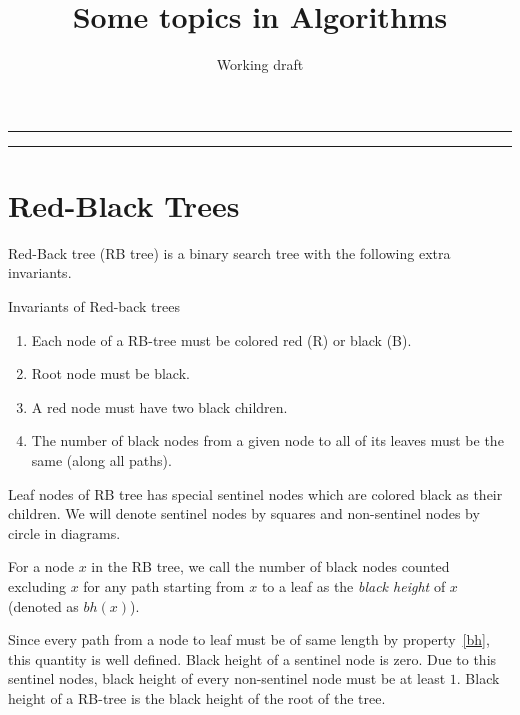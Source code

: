 \documentclass[10pt]{article}
\begin{document}
\title{Some topics in Algorithms}
\author{Working draft}
\maketitle
\hrule
\begin{multicols}{2}
{\footnotesize \tableofcontents }
\end{multicols}
\hrule

\section{Red-Black Trees}
\begin{center}
\end{center}
Red-Back tree (RB tree) is a binary search tree with the following extra
invariants.  
\begin{definition}{Invariants of Red-back trees}
\begin{enumerate}
	\item Each node of a RB-tree must be colored red (R) or black (B).
		\label{r_or_b}
	\item Root node must be black. \label{r_m_b}
	\item A red node must have two black children. \label{r_m_bc}
	\item The number of black nodes from a given node to all of its 
		leaves must be the same (along all paths). \label{bh}
\end{enumerate}
\end{definition}
Leaf nodes of RB tree has special sentinel nodes which are colored black as
their children. We will denote sentinel nodes by squares and non-sentinel
nodes by circle in diagrams.

\begin{definition}
For a node $x$ in the RB tree, we call the number of black nodes counted
excluding $x$ for any path starting from $x$ to a leaf as the \emph{black
height} of $x$ (denoted as $bh(x)$).
\end{definition}
Since every path from a node to leaf must be of same length by
property~\ref{bh}, this quantity is well defined. Black height of a sentinel
node is zero. Due to this sentinel nodes, black height of every non-sentinel
node must be at least $1$. Black height of a RB-tree is the black
height of the root of the tree.
\end{document}
